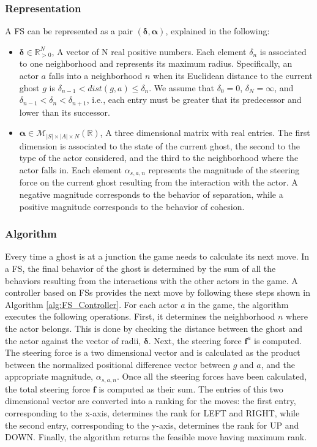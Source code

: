 \documentclass[journal]{IEEEtran}
\begin{document}
\subsubsection{Representation}
A FS can be represented as a pair $(\boldsymbol\delta, \boldsymbol\alpha)$, explained in the following:
\begin{itemize}
  \item $\boldsymbol\delta \in \mathbb{R}_{>0}^N$, A vector of N real positive numbers. Each element $\delta_n$ is associated to one neighborhood and represents its maximum radius. Specifically, an actor $a$ falls into a neighborhood $n$ when its Euclidean distance to the current ghost $g$ is $\delta_{n-1} < dist(g,a) \leq \delta_n$. We assume that $\delta_0 = 0$, $\delta_N = \infty$, and $\delta_{n-1} < \delta_n < \delta_{n+1}$, i.e., each entry must be greater that its predecessor and lower than its successor.
  \item $\boldsymbol\alpha \in \mathcal{M}_{|S| \times |A| \times N}(\mathbb{R})$, A three dimensional matrix with real entries. The first dimension is associated to the state of the current ghost, the second to the type of the actor considered, and the third to the neighborhood where the actor falls in. Each element $\alpha_{s,a,n}$ represents the magnitude of the steering force on the current ghost resulting from the interaction with the actor. A negative magnitude corresponds to the behavior of separation, while a positive magnitude corresponds to the behavior of cohesion.
\end{itemize}

\subsubsection{Algorithm}
Every time a ghost is at a junction the game needs to calculate its next move. In a FS, the final behavior of the ghost is determined by the sum of all the behaviors resulting from the interactions with the other actors in the game. A controller based on FSs provides the next move by following these steps shown in Algorithm \ref{alg:FS_Controller}. For each actor $a$ in the game, the algorithm executes the following operations. First, it determines the neighborhood $n$ where the actor belongs. This is done by checking the distance between the ghost and the actor against the vector of radii, $\boldsymbol\delta$. Next, the steering force $\mathbf{f}^a$ is computed. The steering force is a two dimensional vector and is calculated as the product between the normalized positional difference vector between $g$ and $a$, and the appropriate magnitude, $\alpha_{s,a,n}$. Once all the steering forces have been calculated, the total steering force $\mathbf{f}$ is computed as their sum. The entries of this two dimensional vector are converted into a ranking for the moves: the first entry, corresponding to the x-axis, determines the rank for LEFT and RIGHT, while the second entry, corresponding to the y-axis, determines the rank for UP and DOWN. Finally, the algorithm returns the feasible move having maximum rank.
\end{document}
